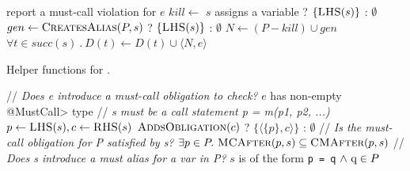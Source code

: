 \begin{algorithm}[t]
\begin{algorithmic}[1]
  \EndFor  \label{li:end-init}
     \label{li:end-scope}
      \State report a must-call violation for $e$
     \label{li:check-satisfied}
    \State $kill \gets $ $s$ assigns a variable ? $\{\textsc{LHS}(s)\}$ : $\emptyset$ \label{li:compute-kill}
    \State $gen \gets \textsc{CreatesAlias}(P,s)$ ? $\{\textsc{LHS}(s)\}$ : $\emptyset$ \label{li:compute-gen} 
    \State $N \gets (P - kill) \cup gen$ \label{li:compute-new-mc-aliases}
    \State $\forall t \in \mathit{succ}(s)\ .\ D(t) \leftarrow D(t) \cup \langle
    N, e \rangle$ \label{li:prop-to-succs}
    \EndIf
    \EndFor
  \EndWhile \label{li:alg-loop-end}
  \EndProcedure
  \end{algorithmic}
\end{algorithm}

\begin{algorithm}[h]
  \caption{Helper functions for . 
}
  \label{alg:helpers}
  \begin{algorithmic}[1]
  \State // \textit{Does e introduce a must-call obligation to check?}
  \State \Return $e$ has non-empty \<@MustCall> type
  \EndProcedure
  \State // \textit{s must be a call statement p = m(p1, p2, ...)}
  \State $p \gets \textsc{LHS}(s), c \gets \textsc{RHS}(s)$
  \State \Return $\textsc{AddsObligation}(c)$ ? $\{ \langle \{ p \}, c
  \rangle \}$ : $\emptyset$
  \EndProcedure
  \State // \textit{Is the must-call obligation for P satisfied by
    s?}
  \State \Return $\exists p \in P .\ \textsc{MCAfter}(p,s) \subseteq \textsc{CMAfter}(p,s)$
  \EndProcedure
  \State // \textit{Does s introduce a must alias for a var in P?}
    \State \Return $s$ is of the form \lstinline{p = q} $\wedge\ \lstinline{q} \in P$
  \EndProcedure
  \end{algorithmic}

\end{algorithm}


